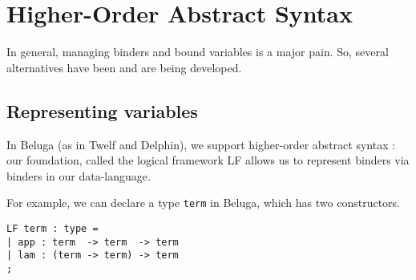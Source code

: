 




\section{Higher-Order Abstract Syntax}\label{sec:HOAS}
In general, managing binders and bound variables is a major pain. So,
several alternatives have been and are being developed.

\subsection{Representing variables}\label{sec:HOAS-var}
In Beluga (as in Twelf and Delphin), we support higher-order abstract
syntax : our foundation, called the logical framework LF
\citep{Harper93jacm} allows us to represent binders via binders in our
data-language.

For example, we can declare a type \lstinline!term! in Beluga,
which has two constructors.

\begin{lstlisting}
LF term : type =
| app : term  -> term  -> term
| lam : (term -> term) -> term
;
\end{lstlisting}

